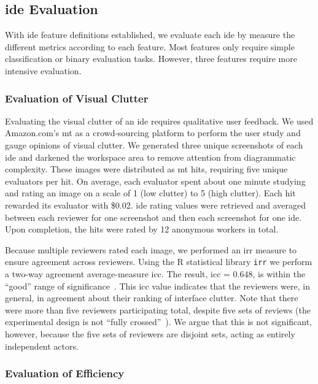 \subsection{\acs{ide} Evaluation} \label{subsec:ideevaluation}

With \ac{ide} feature definitions established, we evaluate each \ac{ide} by measure the different metrics according to each feature.
Most features only require simple classification or binary evaluation tasks.
However, three features require more intensive evaluation.


\subsubsection{Evaluation of Visual Clutter} \label{subsubsec:mturk}

Evaluating the visual clutter of an \ac{ide} requires qualitative user feedback.
We used Amazon.com's \ac{mt} as a crowd-sourcing platform to perform the user study and gauge opinions of visual clutter.
We generated three unique screenshots of each \ac{ide} and darkened the workspace area to remove attention from diagrammatic complexity.
These images were distributed as \ac{mt} \acp{hit}, requiring five unique evaluators per \ac{hit}.
On average, each evaluator spent about one minute studying and rating an image on a scale of 1 (low clutter) to 5 (high clutter).
Each \ac{hit} rewarded its evaluator with \$0.02.
\ac{ide} rating values were retrieved and averaged between each reviewer for one screenshot and then each screenshot for one \ac{ide}.
Upon completion, the \acp{hit} were rated by 12 anonymous workers in total.

Because multiple reviewers rated each image, we performed an \ac{irr} measure to ensure agreement across reviewers.
Using the R statistical library \texttt{irr} we perform a two-way agreement average-measure \ac{icc}.
The result, \ac{icc} = 0.648, is within the ``good'' range of significance~\cite{cicchetti1994,hallgren2012}.
This \ac{icc} value indicates that the reviewers were, in general, in agreement about their ranking of interface clutter.
Note that there were more than five reviewers participating total, despite five sets of reviews (\ie the experimental design is not ``fully crossed''~\cite{hallgren2012}).
We argue that this is not significant, however, because the five sets of reviewers are disjoint sets, acting as entirely independent actors.

\subsubsection{Evaluation of Efficiency} \label{subsubsec:efficiency}

